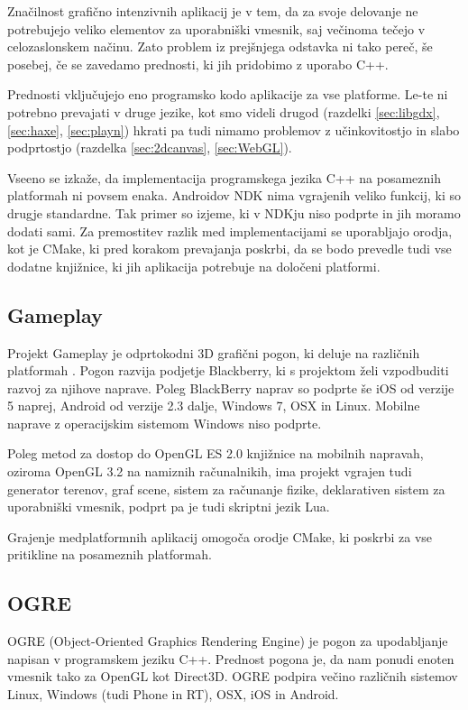 Značilnost grafično intenzivnih aplikacij je v tem, da za svoje delovanje ne potrebujejo veliko elementov za uporabniški vmesnik, saj večinoma tečejo v celozaslonskem načinu. Zato problem iz prejšnjega odstavka ni tako pereč, še posebej, če se zavedamo prednosti, ki jih pridobimo z uporabo C++. 

Prednosti vključujejo eno programsko kodo aplikacije za vse platforme. Le-te ni potrebno prevajati v druge jezike, kot smo videli drugod (razdelki \ref{sec:libgdx}, \ref{sec:haxe}, \ref{sec:playn}) hkrati pa tudi nimamo problemov z učinkovitostjo in slabo podprtostjo (razdelka \ref{sec:2dcanvas}, \ref{sec:WebGL}).

Vseeno se izkaže, da implementacija programskega jezika C++ na posameznih platformah ni povsem enaka. Androidov NDK nima vgrajenih veliko funkcij, ki so drugje standardne. Tak primer so izjeme, ki v NDKju niso podprte in jih moramo dodati sami. Za premostitev razlik med implementacijami se uporabljajo orodja, kot je CMake, ki pred korakom prevajanja poskrbi, da se bodo prevedle tudi vse dodatne knjižnice, ki jih aplikacija potrebuje na določeni platformi.

\subsection{Gameplay}

Projekt Gameplay je odprtokodni 3D grafični pogon, ki deluje na različnih platformah \cite{gameplay}. Pogon razvija podjetje Blackberry, ki s projektom želi vzpodbuditi razvoj za njihove naprave. Poleg BlackBerry naprav so podprte še iOS od verzije 5 naprej, Android od verzije 2.3 dalje, Windows 7, OSX in Linux. Mobilne naprave z operacijskim sistemom Windows niso podprte.

Poleg metod za dostop do OpenGL ES 2.0 knjižnice na mobilnih napravah, oziroma OpenGL 3.2 na namiznih računalnikih, ima projekt vgrajen tudi generator terenov, graf scene, sistem za računanje fizike, deklarativen sistem za uporabniški vmesnik, podprt pa je tudi skriptni jezik Lua.

Grajenje medplatformnih aplikacij omogoča orodje CMake, ki poskrbi za vse pritikline na posameznih platformah. 

\subsection{OGRE}
\label{sec:ogre}
OGRE (Object-Oriented Graphics Rendering Engine) \cite{ogre} je pogon za upodabljanje napisan v programskem jeziku C++. Prednost pogona je, da nam ponudi enoten vmesnik tako za OpenGL kot Direct3D. OGRE podpira večino različnih sistemov Linux, Windows (tudi Phone in RT), OSX, iOS in Android.

